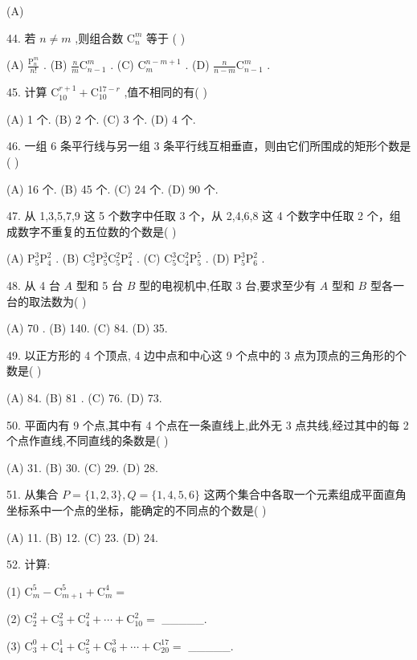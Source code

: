 \documentclass[10pt]{article}
\begin{document}
(A)

44. 若 \(n \neq  m\) ,则组合数 \({\mathrm{C}}_{n}^{m}\) 等于 ( )

(A) \(\frac{{\mathrm{P}}_{n}^{m}}{n!}\) . (B) \(\frac{n}{m}{\mathrm{C}}_{n - 1}^{m}\) . (C) \({\mathrm{C}}_{m}^{n - m + 1}\) . (D) \(\frac{n}{n - m}{\mathrm{C}}_{n - 1}^{m}\) .

45. 计算 \({\mathrm{C}}_{10}^{r + 1} + {\mathrm{C}}_{10}^{{17} - r}\) ,值不相同的有( )

(A) 1 个. (B) 2 个. (C) 3 个. (D) 4 个.

46. 一组 6 条平行线与另一组 3 条平行线互相垂直，则由它们所围成的矩形个数是( )

(A) 16 个. (B) 45 个. (C) 24 个. (D) 90 个.

47. 从 1,3,5,7,9 这 5 个数字中任取 3 个，从 2,4,6,8 这 4 个数字中任取 2 个，组成数字不重复的五位数的个数是( )

(A) \({\mathrm{P}}_{5}^{3}{\mathrm{P}}_{4}^{2}\) . (B) \({\mathrm{C}}_{5}^{3}{\mathrm{P}}_{5}^{3}{\mathrm{C}}_{5}^{2}{\mathrm{P}}_{4}^{2}\) . (C) \({\mathrm{C}}_{5}^{3}{\mathrm{C}}_{4}^{2}{\mathrm{P}}_{5}^{5}\) . (D) \({\mathrm{P}}_{5}^{3}{\mathrm{P}}_{6}^{2}\) .

48. 从 4 台 \(A\) 型和 5 台 \(B\) 型的电视机中,任取 3 台,要求至少有 \(A\) 型和 \(B\) 型各一台的取法数为( )

(A) 70 . (B) 140. (C) 84. (D) 35.

49. 以正方形的 4 个顶点, 4 边中点和中心这 9 个点中的 3 点为顶点的三角形的个数是( )

(A) 84. (B) 81 . (C) 76. (D) 73.

50. 平面内有 9 个点,其中有 4 个点在一条直线上,此外无 3 点共线,经过其中的每 2 个点作直线,不同直线的条数是( )

(A) 31. (B) 30. (C) 29. (D) 28.

51. 从集合 \(P = \{ 1,2,3\} ,Q = \{ 1,4,5,6\}\) 这两个集合中各取一个元素组成平面直角坐标系中一个点的坐标，能确定的不同点的个数是( )

(A) 11. (B) 12. (C) 23. (D) 24.

52. 计算:

(1) \({\mathrm{C}}_{m}^{5} - {\mathrm{C}}_{m + 1}^{5} + {\mathrm{C}}_{m}^{4} =\)

(2) \({\mathrm{C}}_{2}^{2} + {\mathrm{C}}_{3}^{2} + {\mathrm{C}}_{4}^{2} + \cdots  + {\mathrm{C}}_{10}^{2} =\) \_\_\_\_\_.

(3) \({\mathrm{C}}_{3}^{0} + {\mathrm{C}}_{4}^{1} + {\mathrm{C}}_{5}^{2} + {\mathrm{C}}_{6}^{3} + \cdots  + {\mathrm{C}}_{20}^{17} =\) \_\_\_\_\_.
\end{document}
